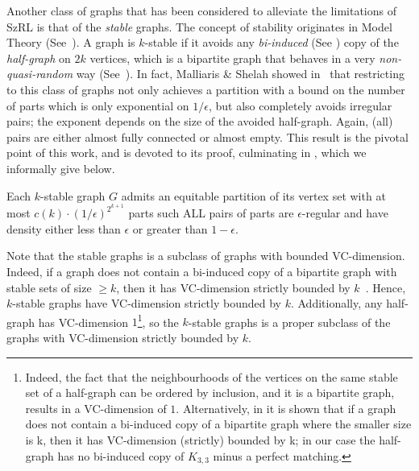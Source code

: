         Another class of graphs that has been considered to alleviate the limitations of SzRL is that of the \emph{stable}
        graphs.
        The concept of stability originates in Model Theory
        (See~\cite{classification_theory_and_the_number_of_non_isomorphic_models}).
        A graph is $k$-stable if it avoids any \emph{bi-induced} (See ) copy of the \emph{half-graph}
        on $2k$ vertices, which is a bipartite graph that behaves in a very \emph{non-quasi-random} way (See~).
        In fact, Malliaris \& Shelah showed in~\cite[Theorem 5.19]{regularity_lemmas_for_stable_graphs} that restricting
        to this class of graphs not only achieves a partition with a bound on the number of parts which is only exponential
        on $1/\epsilon$, but also completely avoids irregular pairs; the exponent depends on the size of the avoided half-graph.
        Again, (all) pairs are either almost fully connected or almost empty.
        This result is the pivotal point of this work, and  is devoted to its proof,
        culminating in , which we informally give below.

        \begin{theoremB} \label{thm:A}
            Each $k$-stable graph $G$ admits an equitable partition of its vertex set with at most
            ${c(k)\cdot(1/\epsilon)^{2^{k+1}}}$ parts such ALL pairs of parts
            are $\epsilon$-regular and have density either less than $\epsilon$ or greater than $1 - \epsilon$.
        \end{theoremB}

        Note that the stable graphs is a subclass of graphs with bounded VC-dimension.
        Indeed, if a graph does not contain a bi-induced copy of a bipartite graph with stable sets of size $\geq k$,
        then it has VC-dimension strictly bounded by $k$~\cite{regularity_partitions_and_the_topology_of_graphons}.
        Hence, $k$-stable graphs have VC-dimension strictly bounded by $k$.
        Additionally, any half-graph has VC-dimension $1$\footnote{
            Indeed, the fact that the neighbourhoods of the vertices on the same stable set of a half-graph can be
            ordered by inclusion, and it is a bipartite graph, results in a VC-dimension of $1$.
            Alternatively, in \cite{regularity_partitions_and_the_topology_of_graphons} it is shown that if a graph does not
            contain a bi-induced copy of a bipartite graph where the smaller size is k, then it has VC-dimension (strictly)
            bounded by k; in our case the half-graph has no bi-induced copy of $K_{3,3}$ minus a perfect matching.},
        so the $k$-stable graphs is a proper subclass of the graphs with VC-dimension strictly bounded by $k$.


